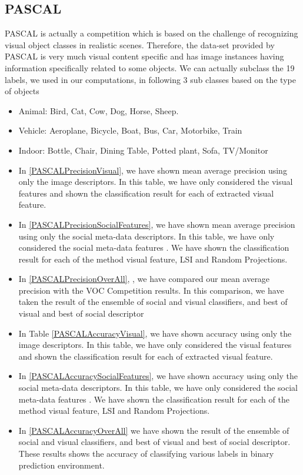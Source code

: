 \subsection{PASCAL}

PASCAL is actually a competition which is based on the 
challenge of recognizing visual object classes in realistic scenes. 
Therefore, the data-set provided by PASCAL is  very much visual content 
specific and has image instances having information specifically 
related to some objects. We can actually subclass the 19 labels, we 
used in our computations, in following 3 sub classes based on the type of objects

\begin{itemize}
\item Animal: Bird, Cat, Cow, Dog, Horse, Sheep. 
\item Vehicle: Aeroplane, Bicycle, Boat, Bus, Car, Motorbike, Train
\item Indoor: Bottle, Chair, Dining Table, Potted plant, Sofa, TV/Monitor

\end{itemize}



\begin{itemize}
\item In \ref{PASCALPrecisionVisual},  we have shown mean average precision using only the image descriptors. In this table, we have only considered the visual features and shown the classification result for each of extracted visual feature.
\item In \ref{PASCALPrecisionSocialFeatures}, we have shown mean average precision using only the social meta-data descriptors. In this table, we have only considered the social meta-data features . We have shown the classification result for each of the method visual feature, LSI and Random Projections.
\item In \ref{PASCALPrecisionOverAll}, , we have compared our mean average precision with the  VOC Competition results. In this comparison, we have taken the result of the ensemble of social and visual classifiers, and best of visual and best of social descriptor 

\item In Table \ref{PASCALAccuracyVisual},  we have shown accuracy using only the image descriptors. In this table, we have only considered the visual features and shown the classification result for each of extracted visual feature.
\item In \ref{PASCALAccuracySocialFeatures}, we have shown accuracy using only the social meta-data descriptors. In this table, we have only considered the social meta-data features . We have shown the classification result for each of the method visual feature, LSI and Random Projections.
\item In \ref{PASCALAccuracyOverAll} we have shown the result of the ensemble of social and visual classifiers, and best of visual and best of social descriptor. These results shows the accuracy of classifying various labels in binary prediction environment.
\end{itemize}


